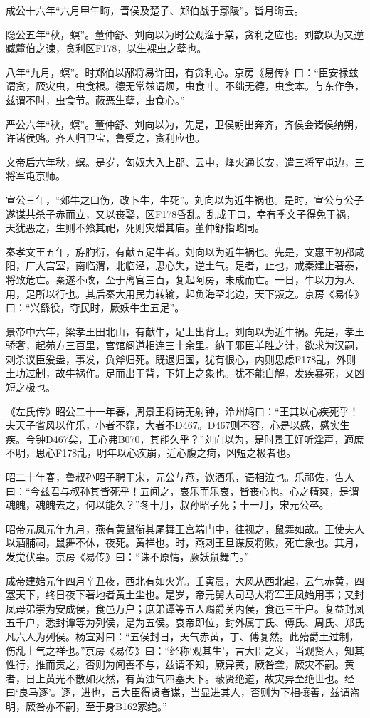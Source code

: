 \documentclass[]{article}
\begin{document}
成公十六年``六月甲午晦，晋侯及楚子、郑伯战于鄢陵''。皆月晦云。

隐公五年``秋，螟''。董仲舒、刘向以为时公观渔于棠，贪利之应也。刘歆以为又逆臧釐伯之谏，贪利区F178，以生裸虫之孽也。

八年``九月，螟''。时郑伯以邴将易许田，有贪利心。京房《易传》曰：``臣安禄兹谓贪，厥灾虫，虫食根。德无常兹谓烦，虫食叶。不绌无德，虫食本。与东作争，兹谓不时，虫食节。蔽恶生孽，虫食心。''

严公六年``秋，螟''。董仲舒、刘向以为，先是，卫侯朔出奔齐，齐侯会诸侯纳朔，许诸侯赂。齐人归卫宝，鲁受之，贪利应也。

文帝后六年秋，螟。是岁，匈奴大入上郡、云中，烽火通长安，遣三将军屯边，三将军屯京师。

宣公三年，``郊牛之口伤，改卜牛，牛死''。刘向以为近牛祸也。是时，宣公与公子遂谋共杀子赤而立，又以丧娶，区F178昏乱。乱成于口，幸有季文子得免于祸，天犹恶之，生则不飨其祀，死则灾燔其庙。董仲舒指略同。

秦孝文王五年，斿朐衍，有献五足牛者。刘向以为近牛祸也。先是，文惠王初都咸阳，广大宫室，南临渭，北临泾，思心失，逆土气。足者，止也，戒秦建止著泰，将致危亡。秦遂不改，至于离官三百，复起阿房，未成而亡。一日，牛以力为人用，足所以行也。其后秦大用民力转输，起负海至北边，天下叛之。京房《易传》曰：``兴繇役，夺民时，厥妖牛生五足''。

景帝中六年，梁孝王田北山，有献牛，足上出背上。刘向以为近牛祸。先是，孝王骄奢，起苑方三百里，宫馆阁道相连三十余里。纳于邪臣羊胜之计，欲求为汉嗣，刺杀议臣爰盎，事发，负斧归死。既退归国，犹有恨心，内则思虑F178乱，外则土功过制，故牛祸作。足而出于背，下奸上之象也。犹不能自解，发疾暴死，又凶短之极也。

《左氏传》昭公二十一年春，周景王将铸无射钟，泠州鸠曰：``王其以心疾死乎！夫天子省风以作乐，小者不窕，大者不D467。D467则不容，心是以感，感实生疾。今钟D467矣，王心弗B070，其能久乎？''刘向以为，是时景王好听淫声，適庶不明，思心F178乱，明年以心疾崩，近心腹之疴，凶短之极者也。

昭二十年春，鲁叔孙昭子聘于宋，元公与燕，饮酒乐，语相泣也。乐祁佐，告人曰：``今兹君与叔孙其皆死乎！五闻之，哀乐而乐哀，皆丧心也。心之精爽，是谓魂魄，魂魄去之，何以能久？''冬十月，叔孙昭子死；十一月，宋元公卒。

昭帝元凤元年九月，燕有黄鼠衔其尾舞王宫端门中，往视之，鼠舞如故。王使夫人以酒脯祠，鼠舞不休，夜死。黄祥也。时，燕刺王旦谋反将败，死亡象也。其月，发觉伏辜。京房《易传》曰：``诛不原情，厥妖鼠舞门。''

成帝建始元年四月辛丑夜，西北有如火光。壬寅晨，大风从西北起，云气赤黄，四塞天下，终日夜下著地者黄土尘也。是岁，帝元舅大司马大将军王凤始用事；又封凤母弟崇为安成侯，食邑万户；庶弟谭等五人赐爵关内侯，食邑三千户。复益封凤五千户，悉封谭等为列侯，是为五侯。哀帝即位，封外属丁氏、傅氏、周氏、郑氏凡六人为列侯。杨宣对曰：``五侯封日，天气赤黄，丁、傅复然。此殆爵土过制，伤乱土气之祥也。''京房《易传》曰：``经称`观其生'，言大臣之义，当观贤人，知其性行，推而贡之，否则为闻善不与，兹谓不知，厥异黄，厥咎聋，厥灾不嗣。黄者，日上黄光不散如火然，有黄浊气四塞天下。蔽贤绝道，故灾异至绝世也。经曰`良马逐'。逐，进也，言大臣得贤者谋，当显进其人，否则为下相攘善，兹谓盗明，厥咎亦不嗣，至于身B162家绝。''
\end{document}
